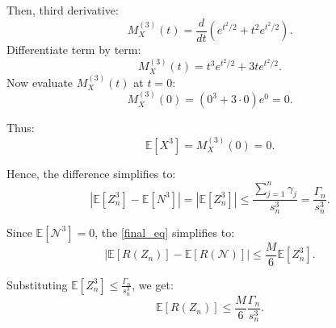Then, third derivative:
   \[
   M_X^{(3)}(t) = \frac{d}{dt} \left( e^{t^2 / 2} + t^2 e^{t^2 / 2} \right).
   \]
   Differentiate term by term:
   \[
   M_X^{(3)}(t) = t^3 e^{t^2 / 2} + 3t e^{t^2 / 2}.
   \]
Now evaluate \( M_X^{(3)}(t) \) at \( t = 0 \):
\[
M_X^{(3)}(0) = (0^3 + 3 \cdot 0) e^{0} = 0.
\]

Thus:
\[
\mathbb{E}[X^3] = M_X^{(3)}(0) = 0.
\]

Hence, the difference simplifies to:
\[
\left| \mathbb{E}[Z_n^3] - \mathbb{E}[N^3] \right| = \left| \mathbb{E}[Z_n^3] \right| \leq \frac{\sum_{j=1}^n \gamma_j}{s_n^3} = \frac{\Gamma_n}{s_n^3}.
\]

Since \( \mathbb{E}[\mathcal{N}^3] = 0 \), the \eqref{final_eq} simplifies to:
\[
\left| \mathbb{E}[R(Z_n)] - \mathbb{E}[R(\mathcal{N})] \right| \leq \frac{M}{6} \mathbb{E}[Z_n^3].
\]

Substituting \( \mathbb{E}[Z_n^3] \leq \frac{\Gamma_n}{s_n^3} \), we get:
\[
\mathbb{E}[R(Z_n)] \leq \frac{M}{6} \frac{\Gamma_n}{s_n^3}.
\]

